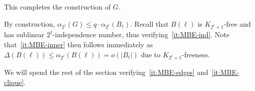 \documentclass[11pt, a4paper]{article}
\theoremstyle{definition}
\begin{document}
\medskip

This completes the construction of $G$.

\medskip

By construction, $\alpha_{2^{\ell}}(G)\le q\cdot\alpha_{2^{\ell}}(B_{\ell})$. Recall that $B(\ell)$ is $K_{2^{\ell}+1}$-free and has sublinear $2^{\ell}$-independence number, thus verifying~\ref{it:MBE-ind}. Note that~\ref{it:MBE-inner} then follows immediately as $\Delta(B(\ell))\le\alpha_{2^\ell}(B(\ell))=o(|B_{\ell}|)$ due to $K_{2^{\ell}+1}$-freeness.

We will spend the rest of the section verifying~\ref{it:MBE-edges} and~\ref{it:MBE-clique}.






\end{document}
